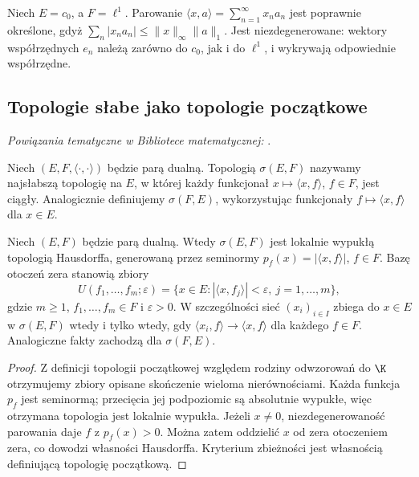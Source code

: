 \begin{przyklad}
Niech $E=c_0$, a $F=\ell^1$. Parowanie
$\langle x,a\rangle=\sum_{n=1}^{\infty}x_na_n$
jest poprawnie określone, gdyż
$\sum_n|x_na_n|\le\|x\|_\infty\|a\|_1$.
Jest niezdegenerowane: wektory współrzędnych $e_n$ należą
zarówno do $c_0$, jak i do $\ell^1$, i wykrywają odpowiednie
współrzędne.
\end{przyklad}

\subsection{Topologie słabe jako topologie początkowe}

\noindent\emph{Powiązania tematyczne w Bibliotece matematycznej:} .


\begin{definicja}\label{def:slaba-para}
Niech $(E,F,\langle\cdot,\cdot\rangle)$ będzie parą dualną.
Topologią $\sigma(E,F)$ nazywamy najsłabszą topologię na $E$,
w której każdy funkcjonał $x\mapsto\langle x,f\rangle$,
$f\in F$, jest ciągły. Analogicznie definiujemy
$\sigma(F,E)$, wykorzystując funkcjonały
$f\mapsto\langle x,f\rangle$ dla $x\in E$.
\end{definicja}

\begin{twierdzenie}\label{thm:slaba-baza}
Niech $(E,F)$ będzie parą dualną. Wtedy $\sigma(E,F)$
jest lokalnie wypukłą topologią Hausdorffa, generowaną przez
seminormy $p_f(x)=|\langle x,f\rangle|$, $f\in F$.
Bazę otoczeń zera stanowią zbiory
\[
 U(f_1,\ldots,f_m;\varepsilon)
 =\{x\in E:|\langle x,f_j\rangle|<\varepsilon,
 \ j=1,\ldots,m\},
\]
gdzie $m\ge1$, $f_1,\ldots,f_m\in F$ i $\varepsilon>0$.
W szczególności sieć $(x_i)_{i\in I}$ zbiega do $x\in E$
w $\sigma(E,F)$ wtedy i tylko wtedy, gdy
$\langle x_i,f\rangle\to\langle x,f\rangle$ dla każdego $f\in F$.
Analogiczne fakty zachodzą dla $\sigma(F,E)$.
\end{twierdzenie}
\begin{proof}
Z definicji topologii początkowej względem rodziny
odwzorowań do $\K$ otrzymujemy zbiory opisane skończenie
wieloma nierównościami. Każda funkcja $p_f$ jest seminormą;
przecięcia jej podpoziomic są absolutnie wypukłe, więc
otrzymana topologia jest lokalnie wypukła. Jeżeli $x\ne0$,
niezdegenerowaność parowania daje $f$ z $p_f(x)>0$.
Można zatem oddzielić $x$ od zera otoczeniem zera,
co dowodzi własności Hausdorffa. Kryterium zbieżności
jest własnością definiującą topologię początkową.
\end{proof}

